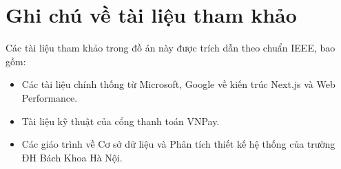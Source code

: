 \documentclass[../main.tex]{subfiles}
\begin{document}
\section{Ghi chú về tài liệu tham khảo}
Các tài liệu tham khảo trong đồ án này được trích dẫn theo chuẩn IEEE, bao gồm:
\begin{itemize}
    \item Các tài liệu chính thống từ Microsoft, Google về kiến trúc Next.js và Web Performance.
    \item Tài liệu kỹ thuật của cổng thanh toán VNPay.
    \item Các giáo trình về Cơ sở dữ liệu và Phân tích thiết kế hệ thống của trường ĐH Bách Khoa Hà Nội.
\end{itemize}
\end{document}
